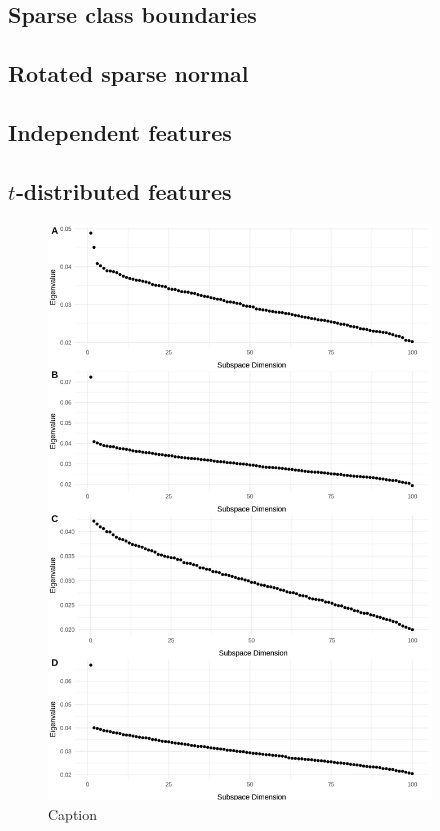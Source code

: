 \documentclass[12pt]{article}
\begin{document}
\subsection{Sparse class boundaries}




\subsection{Rotated sparse normal}


\subsection{Independent features}


\subsection{$t$‐distributed features}

\begin{figure}
    \centering
    \includegraphics[width=4in]{figures/sim_evs.png}
    \caption{Caption}
    \label{fig:sim_evs}
\end{figure}
\end{document}
